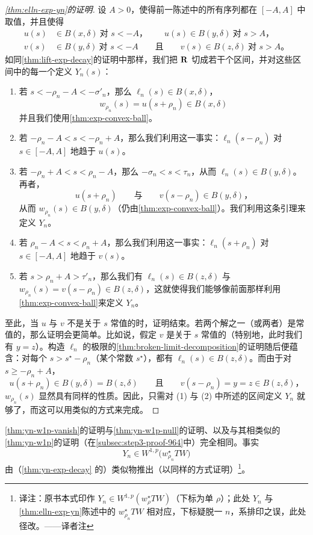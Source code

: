\begin{proof}[\cref{thm:elln-exp-yn}的证明]
设 $A>0$，使得前一陈述中的所有序列都在 $[-A,A]$ 中取值，并且使得
\[
\begin{aligned}
u(s)&\in B(x,\delta)\ \text{对 } s<-A\text{，}\qquad
u(s)\in B(y,\delta)\ \text{对 } s>A\text{，}\\
v(s)&\in B(y,\delta)\ \text{对 } s<-A
\qquad\text{且}\qquad
v(s)\in B(z,\delta)\ \text{对 } s>A\text{。}
\end{aligned}
\]
如同\cref{thm:lift-exp-decay}的证明中那样，我们把 $\mathbf{R}$ 切成若干个区间，并对这些区间中的每一个定义 $Y_{n}(s)$：
\begin{enumerate}[label=(\arabic*)]
\item 若 $s<-\rho_{n}-A<-\sigma'_{n}$，那么 $\ell_{n}(s)\in B(x,\delta)$，
\[
w_{\rho_{n}}(s)=u(s+\rho_{n})\in B(x,\delta)
\]
并且我们使用\cref{thm:exp-convex-ball}。
\item 若 $-\rho_{n}-A<s<-\rho_{n}+A$，那么我们利用这一事实：$\ell_{n}(s-\rho_{n})$ 对 $s\in[-A,A]$ \trUniform{}地趋于 $u(s)$。
\item 若 $-\rho_{n}+A<s<\rho_{n}-A$，那么 $-\sigma_{n}<s<\tau_{n}$，从而 $\ell_{n}(s)\in B(y,\delta)$。再者，
\[
u(s+\rho_{n})
\qquad\text{与}\qquad
v(s-\rho_{n})\in B(y,\delta)\text{，}
\]
从而 $w_{\rho_{n}}(s)\in B(y,\delta)$（仍由\cref{thm:exp-convex-ball}）。我们利用这条引理来定义 $Y_{n}$。
\item 若 $\rho_{n}-A<s<\rho_{n}+A$，那么我们利用这一事实：$\ell_{n}(s+\rho_{n})$ 对 $s\in[-A,A]$ \trUniform{}地趋于 $v(s)$。
\item 若 $s>\rho_{n}+A>\tau'_{n}$，那么我们有 $\ell_{n}(s)\in B(z,\delta)$ 与 $w_{\rho_{n}}(s)=v(s-\rho_{n})\in B(z,\delta)$，这就使得我们能够像前面那样利用\cref{thm:exp-convex-ball}来定义 $Y_{n}$。
\end{enumerate}

至此，当 $u$ 与 $v$ 不是关于 $s$ 常值的时，证明结束。若两个解之一（或两者）是常值的，那么证明会更简单。比如说，假定 $v$ 是关于 $s$ 常值的（特别地，此时我们有 $y=z$）。构造 $\ell_{n}$ 的\trBrokenTrajectory{}极限的\cref{thm:broken-limit-decomposition}的证明随后便蕴含：对每个 $s>s^{\star}-\rho_{n}$（某个常数 $s^{\star}$），都有 $\ell_{n}(s)\in B(z,\delta)$。而由于对 $s\ge-\rho_{n}+A$，
\[
u(s+\rho_{n})\in B(y,\delta)=B(z,\delta)
\qquad\text{且}\qquad
v(s-\rho_{n})=y=z\in B(z,\delta)\text{，}
\]
\trPregluing{} $w_{\rho_{n}}(s)$ 显然具有同样的性质。因此，只需对 (1) 与 (2) 中所述的区间定义 $Y_{n}$ 就够了，而这可以用类似的方式来完成。
\end{proof}

\cref{thm:yn-w1p-vanish}的证明与\cref{thm:yn-w1p-null}的证明、以及与其相类似的\cref{thm:yn-w1p}的证明（在\cref{subsec:step3-proof-964}中）完全相同。事实
\[
Y_{n}\in W^{1,p}\bigl(w_{\rho_{n}}^{\star}TW\bigr)
\]
由（\cref{thm:yn-exp-decay} 的）类似物推出（以同样的方式证明）\footnote{译注：原书本式印作 $Y_{n}\in W^{1,p}(w_{\rho}^{\star}TW)$（下标为单 $\rho$）；此处 $Y_{n}$ 与\cref{thm:elln-exp-yn}陈述中的 $w_{\rho_{n}}^{\star}TW$ 相对应，下标疑脱一 $n$，系排印之误，此处径改。——译者注}。

